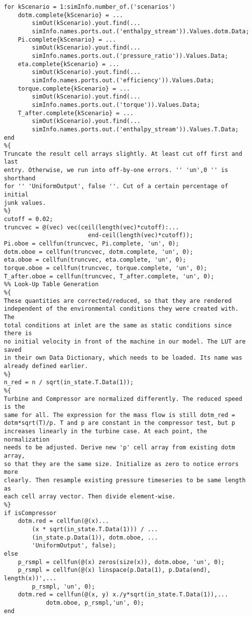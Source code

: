 \begin{lstlisting}
for kScenario = 1:simInfo.number_of.('scenarios')
    dotm.complete{kScenario} = ...
        simOut(kScenario).yout.find(...
        simInfo.names.ports.out.('enthalpy_stream')).Values.dotm.Data;
    Pi.complete{kScenario} = ...
        simOut(kScenario).yout.find(...
        simInfo.names.ports.out.('pressure_ratio')).Values.Data;
    eta.complete{kScenario} = ...
        simOut(kScenario).yout.find(...
        simInfo.names.ports.out.('efficiency')).Values.Data;
    torque.complete{kScenario} = ...
        simOut(kScenario).yout.find(...
        simInfo.names.ports.out.('torque')).Values.Data;
    T_after.complete{kScenario} = ...
        simOut(kScenario).yout.find(...
        simInfo.names.ports.out.('enthalpy_stream')).Values.T.Data;
end
%{
Truncate the result cell arrays slightly. At least cut off first and last
entry. Otherwise, we run into off-by-one errors. '' 'un',0 '' is shorthand
for '' 'UniformOutput', false ''. Cut of a certain percentage of initial
junk values.
%}
cutoff = 0.02;
truncvec = @(vec) vec(ceil(length(vec)*cutoff):...
                        end-ceil(length(vec)*cutoff));
Pi.oboe = cellfun(truncvec, Pi.complete, 'un', 0);
dotm.oboe = cellfun(truncvec, dotm.complete, 'un', 0);
eta.oboe = cellfun(truncvec, eta.complete, 'un', 0);
torque.oboe = cellfun(truncvec, torque.complete, 'un', 0);
T_after.oboe = cellfun(truncvec, T_after.complete, 'un', 0);
%% Look-Up Table Generation
%{
These quantities are corrected/reduced, so that they are rendered
independent of the environmental conditions they were created with. The
total conditions at inlet are the same as static conditions since there is
no initial velocity in front of the machine in our model. The LUT are saved
in their own Data Dictionary, which needs to be loaded. Its name was
already defined earlier.
%}
n_red = n / sqrt(in_state.T.Data(1));
%{
Turbine and Compressor are normalized differently. The reduced speed is the
same for all. The expression for the mass flow is still dotm_red =
dotm*sqrt(T)/p. T and p are constant in the compressor test, but p
increases linearly in the turbine case. At each point, the normalization
needs to be adjusted. Derive new 'p' cell array from existing dotm array,
so that they are the same size. Initialize as zero to notice errors more
clearly. Then resample existing pressure timeseries to be same length as
each cell array vector. Then divide element-wise.
%}
if isCompressor
    dotm.red = cellfun(@(x)...
        (x * sqrt(in_state.T.Data(1))) / ...
        (in_state.p.Data(1)), dotm.oboe, ...
        'UniformOutput', false);
else
    p_rsmpl = cellfun(@(x) zeros(size(x)), dotm.oboe, 'un', 0);
    p_rsmpl = cellfun(@(x) linspace(p.Data(1), p.Data(end), length(x))',...
        p_rsmpl, 'un', 0);
    dotm.red = cellfun(@(x, y) x./y*sqrt(in_state.T.Data(1)),...
            dotm.oboe, p_rsmpl,'un', 0);
end


\end{lstlisting}
